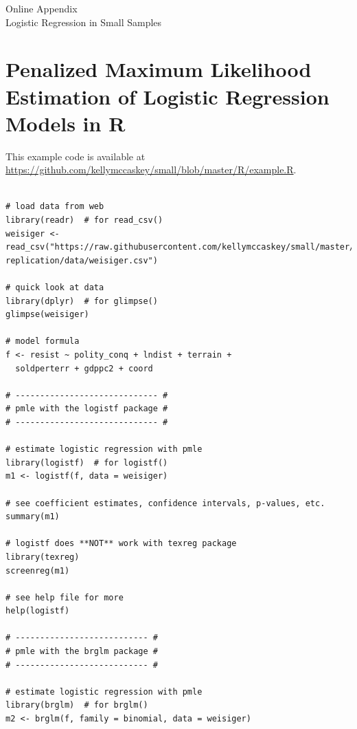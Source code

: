 \documentclass[12pt]{article}
\begin{document}
\singlespace 
\newpage
\normalsize


%

\newpage
\begin{appendix}
\begin{center}
{\LARGE Online Appendix}\\
\vspace{3mm}
{\large Logistic Regression in Small Samples}\\\vspace{2mm}
\end{center}

\section{Penalized Maximum Likelihood Estimation of Logistic Regression Models in R}\label{sec:pmle-in-R}

This example code is available at \href{https://github.com/kellymccaskey/small/blob/master/R/example.R}{https://github.com/kellymccaskey/small/blob/master/R/example.R}.

\begin{verbatim}

# load data from web
library(readr)  # for read_csv()
weisiger <- read_csv("https://raw.githubusercontent.com/kellymccaskey/small/master/weisiger-replication/data/weisiger.csv") 

# quick look at data
library(dplyr)  # for glimpse()
glimpse(weisiger)

# model formula
f <- resist ~ polity_conq + lndist + terrain + 
  soldperterr + gdppc2 + coord

# ----------------------------- #
# pmle with the logistf package #
# ----------------------------- #

# estimate logistic regression with pmle
library(logistf)  # for logistf()
m1 <- logistf(f, data = weisiger)

# see coefficient estimates, confidence intervals, p-values, etc.
summary(m1)

# logistf does **NOT** work with texreg package
library(texreg)
screenreg(m1)

# see help file for more
help(logistf)

# --------------------------- #
# pmle with the brglm package #
# --------------------------- #

# estimate logistic regression with pmle
library(brglm)  # for brglm()
m2 <- brglm(f, family = binomial, data = weisiger)


\end{verbatim}
\end{appendix}
\end{document}
